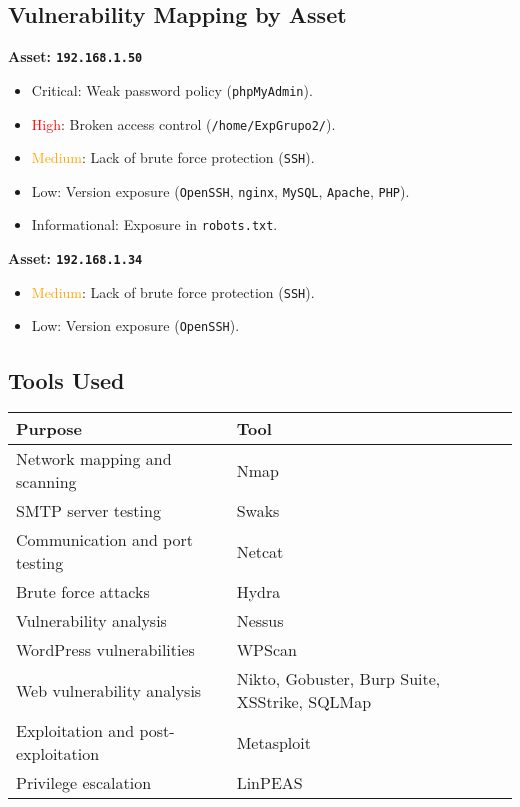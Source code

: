 \documentclass[a4paper,12pt]{article}
\begin{document}
\subsection{Vulnerability Mapping by Asset}
\textbf{Asset: \texttt{192.168.1.50}}
\begin{itemize}
    \item \textcolor{BrickRed}{Critical}: Weak password policy (\texttt{phpMyAdmin}).
    \item \textcolor{Red}{High}: Broken access control (\texttt{/home/ExpGrupo2/}).
    \item \textcolor{Orange}{Medium}: Lack of brute force protection (\texttt{SSH}).
    \item \textcolor{NavyBlue}{Low}: Version exposure (\texttt{OpenSSH}, \texttt{nginx}, \texttt{MySQL}, \texttt{Apache}, \texttt{PHP}).
    \item \textcolor{Periwinkle}{Informational}: Exposure in \texttt{robots.txt}.
\end{itemize}

\textbf{Asset: \texttt{192.168.1.34}}
\begin{itemize}
    \item \textcolor{Orange}{Medium}: Lack of brute force protection (\texttt{SSH}).
    \item \textcolor{NavyBlue}{Low}: Version exposure (\texttt{OpenSSH}).
\end{itemize}

\subsection{Tools Used}
\begin{table}[ht]
    \centering
    \begin{tabular}{ll}
        \toprule
        \rowcolor{gray!20} \textbf{Purpose} & \textbf{Tool} \\
        \midrule
        Network mapping and scanning & Nmap \\
        SMTP server testing & Swaks \\
        Communication and port testing & Netcat \\
        Brute force attacks & Hydra \\
        Vulnerability analysis & Nessus \\
        WordPress vulnerabilities & WPScan \\
        Web vulnerability analysis & Nikto, Gobuster, Burp Suite, XSStrike, SQLMap \\
        Exploitation and post-exploitation & Metasploit \\
        Privilege escalation & LinPEAS \\
        \bottomrule
    \end{tabular}
\end{table}
\end{document}
